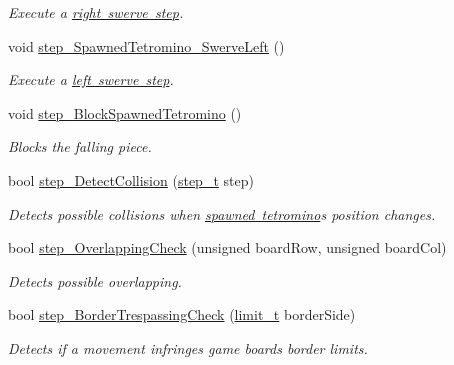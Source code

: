 \begin{DoxyCompactItemize}
\begin{DoxyCompactList}\small\item\em Execute a \mbox{\hyperlink{TetreesDefs_8hpp_a4d5a793092a473f85b4c1f7faf62afeda86fdea6e730f10b7d265b067552624d3}{right swerve step}}. \end{DoxyCompactList}\item 
void \mbox{\hyperlink{classTetreesEngine_ab7169a28a06a867ada69a01a580fb2ad}{step\+\_\+\+Spawned\+Tetromino\+\_\+\+Swerve\+Left}} ()
\begin{DoxyCompactList}\small\item\em Execute a \mbox{\hyperlink{TetreesDefs_8hpp_a4d5a793092a473f85b4c1f7faf62afeda3b27946656fc3bf9470a8b7761cfa8e1}{left swerve step}}. \end{DoxyCompactList}\item 
void \mbox{\hyperlink{classTetreesEngine_a0978ef1f287f00a8ed5a4af2d680b943}{step\+\_\+\+Block\+Spawned\+Tetromino}} ()
\begin{DoxyCompactList}\small\item\em Blocks the falling piece. \end{DoxyCompactList}\item 
bool \mbox{\hyperlink{classTetreesEngine_a25f8b896240ce2d2a34b1d968e75b5b6}{step\+\_\+\+Detect\+Collision}} (\mbox{\hyperlink{TetreesDefs_8hpp_a4d5a793092a473f85b4c1f7faf62afed}{step\+\_\+t}} step)
\begin{DoxyCompactList}\small\item\em Detects possible collisions when \mbox{\hyperlink{classTetreesEngine_a26435ee2f02d9ba70d9e359745114f6e}{spawned tetromino}}\textquotesingle{}s position changes. \end{DoxyCompactList}\item 
bool \mbox{\hyperlink{classTetreesEngine_a270b227c9dfbfb72513c6cdfdd910d1b}{step\+\_\+\+Overlapping\+Check}} (unsigned board\+Row, unsigned board\+Col)
\begin{DoxyCompactList}\small\item\em Detects possible overlapping. \end{DoxyCompactList}\item 
bool \mbox{\hyperlink{classTetreesEngine_aa593f5f688e984a2cdbbf83b162d00a2}{step\+\_\+\+Border\+Trespassing\+Check}} (\mbox{\hyperlink{TetreesDefs_8hpp_a5dbb1ebfe8a9b95707ac161d3549ed8a}{limit\+\_\+t}} border\+Side)
\begin{DoxyCompactList}\small\item\em Detects if a movement infringes game board\textquotesingle{}s border limits. \end{DoxyCompactList}\item 

\end{DoxyCompactItemize}
